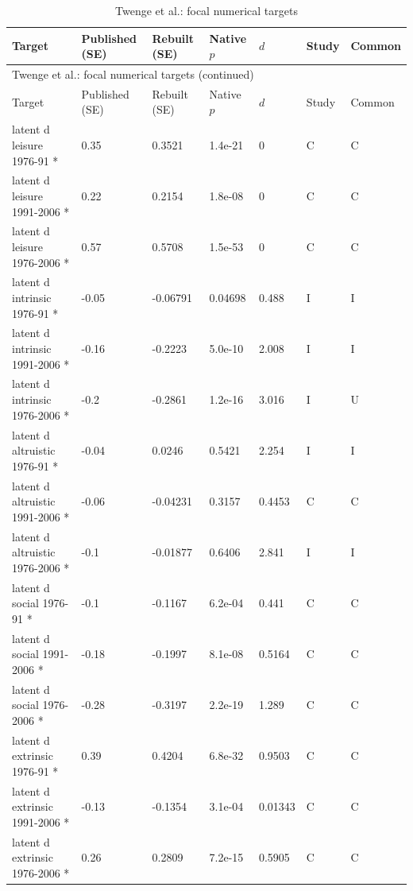{\scriptsize\setlength{\tabcolsep}{3pt}\renewcommand{\arraystretch}{1.06}
\begin{longtable}{@{}p{.245\linewidth}p{.17\linewidth}p{.17\linewidth}p{.085\linewidth}p{.060\linewidth}p{.08\linewidth}p{.07\linewidth}@{}}
\caption{Twenge et al.: focal numerical targets}\label{tab:focal:twenge2010}\\
\toprule Target & Published (SE) & Rebuilt (SE) & Native $p$ & $d$ & Study & Common\\\midrule
\endfirsthead\multicolumn{7}{l}{\small Twenge et al.: focal numerical targets (continued)}\\\toprule Target & Published (SE) & Rebuilt (SE) & Native $p$ & $d$ & Study & Common\\\midrule\endhead\bottomrule\endfoot
latent d leisure 1976-91 * & 0.35 & 0.3521 & 1.4e-21 & 0 & C & C\\
latent d leisure 1991-2006 * & 0.22 & 0.2154 & 1.8e-08 & 0 & C & C\\
latent d leisure 1976-2006 * & 0.57 & 0.5708 & 1.5e-53 & 0 & C & C\\
latent d intrinsic 1976-91 * & -0.05 & -0.06791 & 0.04698 & 0.488 & I & I\\
latent d intrinsic 1991-2006 * & -0.16 & -0.2223 & 5.0e-10 & 2.008 & I & I\\
latent d intrinsic 1976-2006 * & -0.2 & -0.2861 & 1.2e-16 & 3.016 & I & U\\
latent d altruistic 1976-91 * & -0.04 & 0.0246 & 0.5421 & 2.254 & I & I\\
latent d altruistic 1991-2006 * & -0.06 & -0.04231 & 0.3157 & 0.4453 & C & C\\
latent d altruistic 1976-2006 * & -0.1 & -0.01877 & 0.6406 & 2.841 & I & I\\
latent d social 1976-91 * & -0.1 & -0.1167 & 6.2e-04 & 0.441 & C & C\\
latent d social 1991-2006 * & -0.18 & -0.1997 & 8.1e-08 & 0.5164 & C & C\\
latent d social 1976-2006 * & -0.28 & -0.3197 & 2.2e-19 & 1.289 & C & C\\
latent d extrinsic 1976-91 * & 0.39 & 0.4204 & 6.8e-32 & 0.9503 & C & C\\
latent d extrinsic 1991-2006 * & -0.13 & -0.1354 & 3.1e-04 & 0.01343 & C & C\\
latent d extrinsic 1976-2006 * & 0.26 & 0.2809 & 7.2e-15 & 0.5905 & C & C\\
\end{longtable}}
